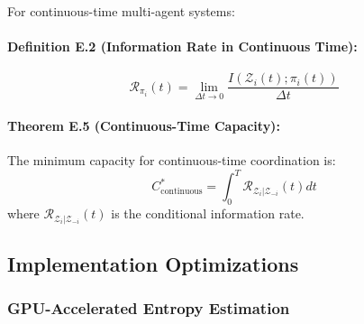 \documentclass[10pt, letterpaper]{article}
\begin{document}
For continuous-time multi-agent systems:

\paragraph{Definition E.2 (Information Rate in Continuous Time):}
\[\mathcal{R}_{\pi_i}(t) = \lim_{\Delta t \to 0} \frac{I(\mathcal{Z}_i(t); \pi_i(t))}{\Delta t}\]

\paragraph{Theorem E.5 (Continuous-Time Capacity):} The minimum capacity for continuous-time coordination is:
\[C^*_{\text{continuous}} = \int_0^T \mathcal{R}_{\mathcal{Z}_i | \mathcal{Z}_{-i}}(t) dt\]
where $\mathcal{R}_{\mathcal{Z}_i | \mathcal{Z}_{-i}}(t)$ is the conditional information rate.

\subsection{Implementation Optimizations}

\subsubsection{GPU-Accelerated Entropy Estimation}
\end{document}
